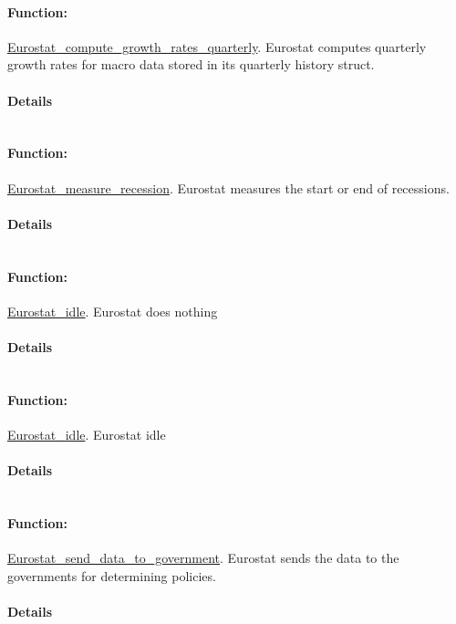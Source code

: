 \documentclass[a4paper,11pt]{article}
\begin{document}
\paragraph{Function:}\url{Eurostat_compute_growth_rates_quarterly}.
Eurostat computes quarterly growth rates for macro data stored in its quarterly history struct.
\paragraph{Details}
\begin{verbatim}
\end{verbatim}
\paragraph{Function:}\url{Eurostat_measure_recession}.
Eurostat measures the start or end of recessions.
\paragraph{Details}
\begin{verbatim}
\end{verbatim}
\paragraph{Function:}\url{Eurostat_idle}.
Eurostat does nothing
\paragraph{Details}
\begin{verbatim}
\end{verbatim}
\paragraph{Function:}\url{Eurostat_idle}.
Eurostat idle
\paragraph{Details}
\begin{verbatim}
\end{verbatim}
\paragraph{Function:}\url{Eurostat_send_data_to_government}.
Eurostat sends the data to the governments for determining policies.
\paragraph{Details}
\begin{verbatim}
\end{verbatim}
\end{document}
